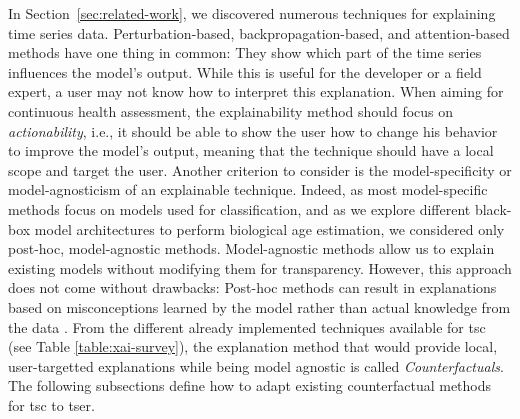 In Section~\ref{sec:related-work}, we discovered numerous techniques for explaining time series data. Perturbation-based, backpropagation-based, and attention-based methods have one thing in common: They show which part of the time series influences the model's output. While this is useful for the developer or a field expert, a user may not know how to interpret this explanation. When aiming for continuous health assessment, the explainability method should focus on \textit{actionability}, i.e., it should be able to show the user how to change his behavior to improve the model's output, meaning that the technique should have a local scope and target the user. Another criterion to consider is the model-specificity or model-agnosticism of an explainable technique. Indeed, as most model-specific methods focus on models used for classification, and as we explore different black-box model architectures to perform biological age estimation, we considered only post-hoc, model-agnostic methods. Model-agnostic methods allow us to explain existing models without modifying them for transparency. However, this approach does not come without drawbacks: Post-hoc methods can result in explanations based on misconceptions learned by the model rather than actual knowledge from the data \cite{laugel_dangers_2019}. From the different already implemented techniques available for \gls{tsc} (see Table \ref{table:xai-survey}), the explanation method that would provide local, user-targetted explanations while being model agnostic is called \textit{Counterfactuals}. The following subsections define how to adapt existing counterfactual methods for \gls{tsc} to \gls{tser}.
 
